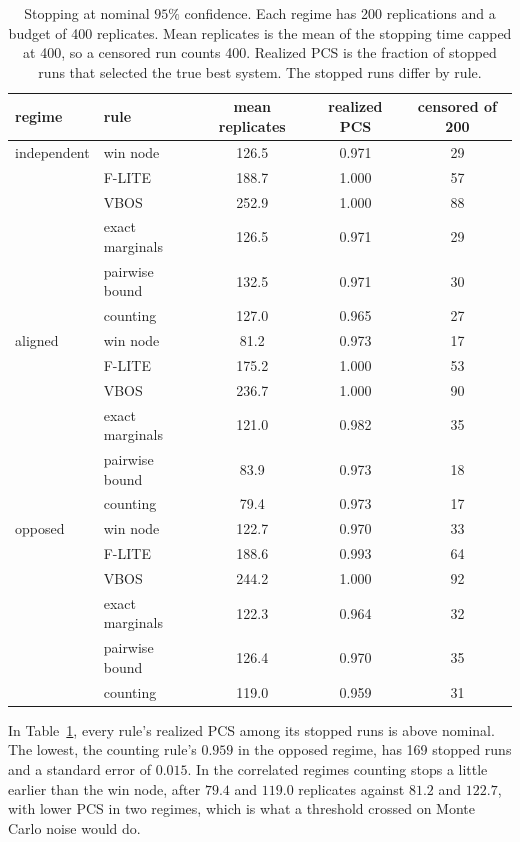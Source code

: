 \documentclass[11pt]{article}
\begin{document}
\begin{table}[h]
\centering
\begin{tabular}{llccc}
\toprule
regime & rule & mean replicates & realized PCS & censored of 200 \\
\midrule
independent & win node & 126.5 & 0.971 & 29 \\
            & F-LITE & 188.7 & 1.000 & 57 \\
            & VBOS  & 252.9 & 1.000 & 88 \\
            & exact marginals & 126.5 & 0.971 & 29 \\
            & pairwise bound & 132.5 & 0.971 & 30 \\
            & counting & 127.0 & 0.965 & 27 \\
\addlinespace
aligned     & win node & \phantom{0}81.2 & 0.973 & 17 \\
            & F-LITE & 175.2 & 1.000 & 53 \\
            & VBOS  & 236.7 & 1.000 & 90 \\
            & exact marginals & 121.0 & 0.982 & 35 \\
            & pairwise bound & \phantom{0}83.9 & 0.973 & 18 \\
            & counting & \phantom{0}79.4 & 0.973 & 17 \\
\addlinespace
opposed     & win node & 122.7 & 0.970 & 33 \\
            & F-LITE & 188.6 & 0.993 & 64 \\
            & VBOS  & 244.2 & 1.000 & 92 \\
            & exact marginals & 122.3 & 0.964 & 32 \\
            & pairwise bound & 126.4 & 0.970 & 35 \\
            & counting & 119.0 & 0.959 & 31 \\
\bottomrule
\end{tabular}
\caption{Stopping at nominal $95\%$ confidence. Each regime has 200
replications and a budget of 400 replicates. Mean replicates is the
mean of the stopping time capped at 400, so a censored run counts 400.
Realized PCS is the fraction of stopped runs that selected the true
best system. The stopped runs differ by rule.}
\label{tab:stopping}
\end{table}

In Table~\ref{tab:stopping}, every rule's realized PCS among its
stopped runs is above nominal. The lowest, the counting rule's
$0.959$ in the opposed regime, has 169 stopped runs and a standard
error of $0.015$. In the correlated regimes counting stops a little
earlier than the win node, after $79.4$ and $119.0$ replicates
against $81.2$ and $122.7$, with lower PCS in two regimes, which is
what a threshold crossed on Monte Carlo noise would do.
\end{document}
